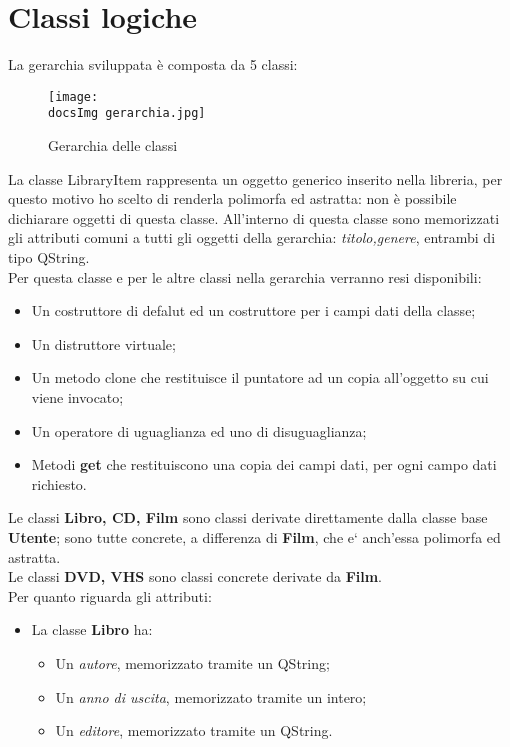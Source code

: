 \section{Classi logiche}{
	La gerarchia sviluppata è composta da 5 classi:
	\begin{figure}[hb]
		\center
		\texttt{[image: \\docsImg gerarchia.jpg]}
		\caption{Gerarchia delle classi}
	\end{figure}
	La classe LibraryItem rappresenta un oggetto generico inserito nella libreria, per questo motivo ho scelto di renderla polimorfa ed astratta: non è possibile dichiarare oggetti di questa classe. All'interno di questa classe sono memorizzati gli attributi comuni a tutti gli oggetti della gerarchia: \textit{titolo,genere}, entrambi di tipo QString. \\
	Per questa classe e per le altre classi nella gerarchia verranno resi disponibili:
	\begin{itemize}\itemsep=0.5pt
		\item Un costruttore di defalut ed un costruttore per i campi dati della classe;
		\item Un distruttore virtuale;
		\item Un metodo clone che restituisce il puntatore ad un copia all'oggetto su cui viene invocato;
		\item Un operatore di uguaglianza ed uno di disuguaglianza;
		\item Metodi \textbf{get} che restituiscono una copia dei campi dati, per ogni campo dati richiesto.
	\end{itemize}
		Le classi  \textbf{Libro, CD, Film} sono classi derivate direttamente dalla classe base \textbf{Utente}; sono tutte concrete, a differenza di \textbf{Film}, che e` anch'essa polimorfa ed astratta. \\
		Le classi \textbf{DVD, VHS} sono classi concrete derivate da \textbf{Film}. \\
		Per quanto riguarda gli attributi:
		\begin{itemize}
			\item La classe \textbf{Libro} ha:
			\begin{itemize}
				\item Un \textit{autore}, memorizzato tramite un QString;
				\item Un \textit{anno di uscita}, memorizzato tramite un intero;
				\item Un \textit{editore}, memorizzato tramite un QString.
			\end{itemize}

\end{itemize}}
